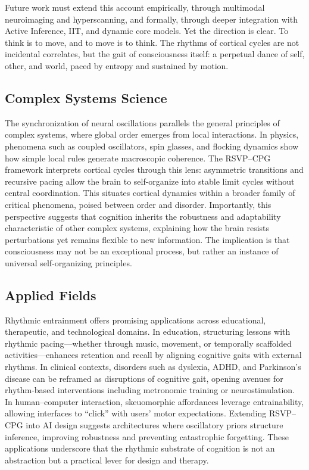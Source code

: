\documentclass{article}
\begin{document}
Future work must extend this account empirically, through multimodal neuroimaging and hyperscanning, and formally, through deeper integration with Active Inference, IIT, and dynamic core models. Yet the direction is clear. To think is to move, and to move is to think. The rhythms of cortical cycles are not incidental correlates, but the gait of consciousness itself: a perpetual dance of self, other, and world, paced by entropy and sustained by motion.

\subsection{Complex Systems Science}

The synchronization of neural oscillations parallels the general principles of complex systems, where global order emerges from local interactions. In physics, phenomena such as coupled oscillators, spin glasses, and flocking dynamics show how simple local rules generate macroscopic coherence. The RSVP--CPG framework interprets cortical cycles through this lens: asymmetric transitions and recursive pacing allow the brain to self-organize into stable limit cycles without central coordination. This situates cortical dynamics within a broader family of critical phenomena, poised between order and disorder. Importantly, this perspective suggests that cognition inherits the robustness and adaptability characteristic of other complex systems, explaining how the brain resists perturbations yet remains flexible to new information. The implication is that consciousness may not be an exceptional process, but rather an instance of universal self-organizing principles.

\subsection{Applied Fields}

Rhythmic entrainment offers promising applications across educational, therapeutic, and technological domains. In education, structuring lessons with rhythmic pacing—whether through music, movement, or temporally scaffolded activities—enhances retention and recall by aligning cognitive gaits with external rhythms. In clinical contexts, disorders such as dyslexia, ADHD, and Parkinson’s disease can be reframed as disruptions of cognitive gait, opening avenues for rhythm-based interventions including metronomic training or neurostimulation. In human–computer interaction, skeuomorphic affordances leverage entrainability, allowing interfaces to “click” with users’ motor expectations. Extending RSVP--CPG into AI design suggests architectures where oscillatory priors structure inference, improving robustness and preventing catastrophic forgetting. These applications underscore that the rhythmic substrate of cognition is not an abstraction but a practical lever for design and therapy.
\end{document}
